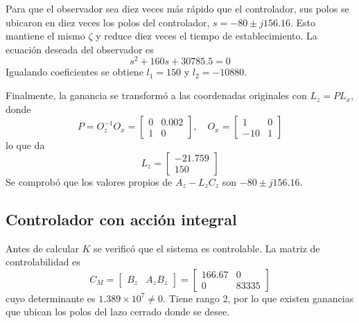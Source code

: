 \documentclass[conference]{IEEEtran}
\begin{document}
Para que el observador sea diez veces más rápido que el controlador, sus polos se ubicaron en diez veces los polos del controlador, $s = -80 \pm j156.16$. Esto mantiene el mismo $\zeta$ y reduce diez veces el tiempo de establecimiento. La ecuación deseada del observador es
\begin{equation}
s^2 + 160s + 30785.5 = 0
\end{equation}
Igualando coeficientes se obtiene $l_1 = 150$ y $l_2 = -10880$.

Finalmente, la ganancia se transformó a las coordenadas originales con $L_z = P L_x$, donde
\begin{equation}
P = O_z^{-1} O_x = \begin{bmatrix} 0 & 0.002 \\ 1 & 0 \end{bmatrix},\quad
O_x = \begin{bmatrix} 1 & 0 \\ -10 & 1 \end{bmatrix}
\end{equation}
lo que da
\begin{equation}
L_z = \begin{bmatrix} -21.759 \\ 150 \end{bmatrix}
\end{equation}
Se comprobó que los valores propios de $A_z - L_z C_z$ son $-80 \pm j156.16$.

\subsection{Controlador con acción integral}

Antes de calcular $K$ se verificó que el sistema es controlable. La matriz de controlabilidad es
\begin{equation}
C_M = \begin{bmatrix} B_z & A_z B_z \end{bmatrix} =
\begin{bmatrix} 166.67 & 0 \\ 0 & 83335 \end{bmatrix}
\end{equation}
cuyo determinante es $1.389\times10^{7} \neq 0$. Tiene rango 2, por lo que existen ganancias que ubican los polos del lazo cerrado donde se desee.
\end{document}

